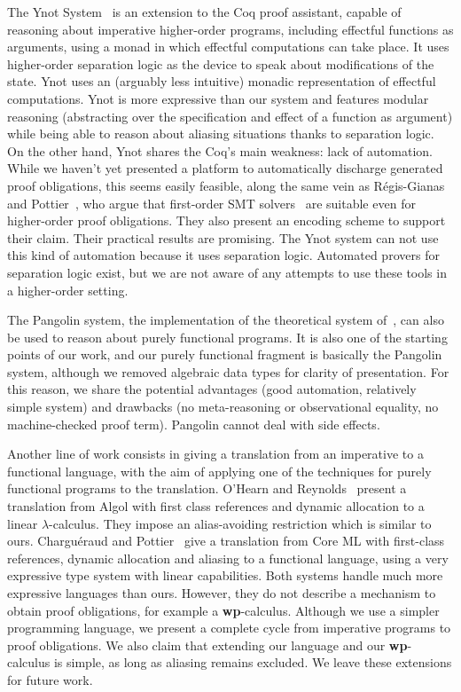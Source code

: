 \documentclass[a4paper]{llncs}
\newcommand{\wpre}{{\bf wp}}
\begin{document}
The Ynot System~\cite{Nanevski08Awkward} is an extension to the Coq
proof assistant, capable of reasoning about imperative higher-order
programs, including effectful functions as arguments, using a monad in
which effectful computations can take place. It uses higher-order
separation logic as the device to speak about modifications of the
state. Ynot uses an (arguably less intuitive) monadic representation
of effectful computations. Ynot is more expressive than our system and
features modular reasoning (abstracting over the specification and
effect of a function as argument) while being able to reason about
aliasing situations thanks to separation logic.  On the other hand,
Ynot shares the Coq's main weakness: lack of automation. While we
haven't yet presented a platform to automatically discharge generated
proof obligations, this seems easily feasible, along the same vein as
Régis-Gianas and Pottier~\cite{regis-gianas-pottier-08}, who argue
that first-order SMT solvers~\cite{RanTin-SMTLIB} are suitable even
for higher-order proof obligations. They also present an encoding
scheme to support their claim. Their practical results are
promising. The Ynot system can not use this kind of automation because
it uses separation logic. Automated provers for separation logic
exist, but we are not aware of any attempts to use these tools in a
higher-order setting.


The Pangolin system, the implementation of the theoretical system
of~\cite{regis-gianas-pottier-08}, can also be used to reason about
purely functional programs. It is also one of the starting points of
our work, and our purely functional fragment is basically the Pangolin
system, although we removed algebraic data types for clarity of
presentation. For this reason, we share the potential advantages (good
automation, relatively simple system) and drawbacks (no
meta-reasoning or observational equality, no machine-checked proof
term). Pangolin cannot deal with side effects.

Another line of work consists in giving a translation from an
imperative to a functional language, with the aim of applying one of
the techniques for purely functional programs to the
translation. O'Hearn and Reynolds~\cite{ohearn-reynolds-00} present a
translation from Algol with first class references and dynamic
allocation to a linear $\lambda$-calculus. They impose an
alias-avoiding restriction which is similar to ours. Charguéraud and
Pottier~\cite{chargueraud-pottier-08} give a translation from Core ML
with first-class references, dynamic allocation and aliasing to a
functional language, using a very expressive type system with linear
capabilities. Both systems handle much more expressive languages than
ours. However, they do not describe a mechanism to obtain proof
obligations, for example a \wpre-calculus. Although we use a simpler
programming language, we present a complete cycle from imperative
programs to proof obligations. We also claim that extending our
language and our \wpre-calculus is simple, as long as aliasing remains
excluded.  We leave these extensions for future work.
\end{document}
